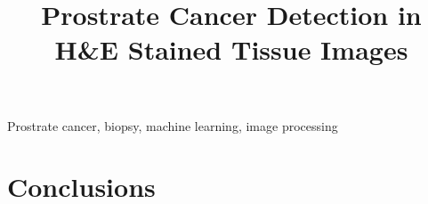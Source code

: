 \documentclass{article}
\title{Prostrate Cancer Detection in H\&E Stained Tissue Images}
\begin{document}
%
\maketitle
%
\begin{abstract}

\end{abstract}
%
\begin{keywords}
Prostrate cancer, biopsy, machine learning, image processing
\end{keywords}
%








\section{Conclusions}
\label{sec:conclusions}




\end{document}

